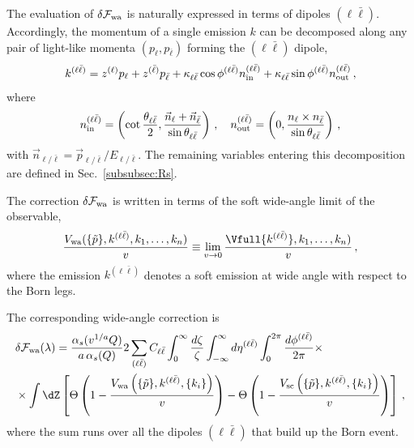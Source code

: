 The evaluation of $\delta\mathcal{F}_{\rm wa}$ is naturally expressed in
terms of dipoles $(\ell\bar\ell)$. Accordingly, the momentum
of a single emission $k$ can be decomposed along any pair of light-like 
momenta $(p_{\ell},p_{\bar \ell})$ forming the $(\ell \bar\ell)$ dipole,
\begin{equation}
\label{eq:Sudakov-decomp}
k^{(\ell\bar\ell)}=z^{(\ell)}p_{\ell}+z^{(\bar\ell)}p_{\bar\ell}+\kappa_{\ell\bar\ell}\cos\phi^{(\ell\bar\ell)}n_{\rm{in}}^{(\ell\bar\ell)}+\kappa_{\ell\bar\ell}\sin\phi^{(\ell\bar\ell)}n_{\rm{out}}^{(\ell\bar\ell)}\,,
\end{equation}
where
\begin{equation}
	n_{\rm in}^{(\ell\bar\ell)}=\left(\cot\frac{\theta_{\ell\bar\ell}}{2},\frac{\vec{n}_{\ell}+\vec{n}_{\bar\ell}}{\sin\theta_{\ell\bar\ell}}\right)\,,\quad n_{\rm out}^{(\ell\bar\ell)}=\left(0,\frac{n_{\ell}\times n_{\bar\ell}}{\sin\theta_{\ell\bar\ell}}\right)\,,
	\end{equation}
with $\vec n_{\ell/\bar\ell}=\vec p_{\ell/\bar\ell}/E_{\ell/\bar\ell}$.
The remaining variables entering this decomposition are defined in
Sec.~\ref{subsubsec:Rs}.

The correction $\delta\mathcal{F}_{\rm wa}$ is written in terms of the
soft wide-angle limit of the observable,
\begin{equation}
  \label{eq:Vwa}
  \frac{V_{\mathrm{wa}}(\{\tilde{p}\}, k^{(\ell\bar{\ell})}, k_1,\dots,k_n)}{v}\equiv \lim_{v\to 0}\frac{\Vfull{k^{(\ell\bar{\ell})}}, k_1,\dots,k_n)}{v}\,,
\end{equation}
where the emission $k^{(\ell\bar\ell)}$ denotes a soft emission at wide angle with
respect to the Born legs.

The corresponding wide-angle correction is
\begin{equation}
\label{eq:dFwa-general}
\begin{aligned}
	&\delta\mathcal{F}_{\mathrm{wa}}(\lambda)=\frac{\alpha_s(v^{1/a}Q)}{a\,\alpha_s(Q)}2\sum_{(\ell\bar\ell)}C_{\ell\bar\ell}\int_0^\infty \frac{d\zeta}{\zeta}
	\int_{-\infty}^\infty d\eta^{(\ell\bar\ell)}\int_0^{2\pi}\frac{d\phi^{(\ell\bar\ell)}}{2\pi}\times\\
	&\times \int \dZ\left[\Theta\left(1-\frac{V_{\mathrm{wa}}\left(\{\tilde{p}\}, k^{(\ell\bar\ell)},\{k_i\}\right)}{v}\right) -\Theta\left(1-\frac{V_{\mathrm{sc}}\left(\{\tilde{p}\}, k^{(\ell\bar\ell)},\{k_i\}\right)}{v}\right)\right]\,,
\end{aligned}
\end{equation}
where the sum runs over all the dipoles $(\ell\bar\ell)$ that build up the Born event. 

